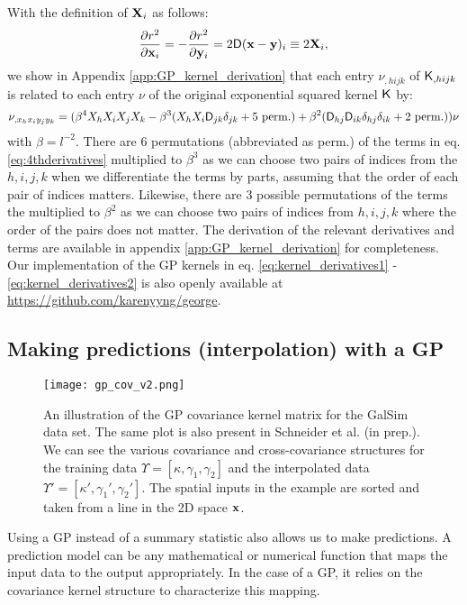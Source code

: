 With the definition of ${\bf X}_i$ as follows:
\begin{equation}
	\frac{\partial r^2}{\partial \mathbf{x}_i} = -\frac{\partial
	r^2}{\partial \mathbf{y}_i} =
	2 \mathsf{D}(\mathbf{x} - \mathbf{y})_i \equiv 2{\bf X}_i,
\end{equation}
we show in Appendix \ref{app:GP_kernel_derivation} 
that each entry $\nu_{,hijk}$ of $\mathsf{K}_{,hijk}$ is
related to each entry $\nu$ of the original exponential squared kernel
$\mathsf{K}$ by:
\begin{equation}
\nu_{,x_h x_i y_j y_k} = (\beta^4 X_h X_i X_j X_k -
\beta^3 (X_h X_i \mathsf{D}_{jk} \delta_{jk} + 5~{\rm perm.}) + \beta^2
(\mathsf{D}_{hj} \mathsf{D}_{ik}\delta_{hj}\delta_{ik} + 2~{\rm perm.})) \nu
\label{eq:4thderivatives}
\end{equation}
with $\beta = l^{-2}$. There are 6 permutations (abbreviated as perm.) of the terms in
eq. \ref{eq:4thderivatives}
multiplied to $\beta^3$ as we can choose two pairs of indices from the $h,i,j,k$ 
when we differentiate the terms by parts, assuming that the order of each
pair of indices matters. 
Likewise, there are 3 possible permutations of
the terms the multiplied to $\beta^2$ as we can choose two pairs of indices from
$h, i, j, k$ where the order of the pairs does not matter.
The derivation of the relevant derivatives and terms are available 
in appendix \ref{app:GP_kernel_derivation} for completeness. 
Our implementation of the GP kernels in eq. \ref{eq:kernel_derivatives1} - 
\ref{eq:kernel_derivatives2} is also openly available at
\href{https://github.com/karenyyng/george}{https://github.com/karenyyng/george}.


\subsection{Making predictions (interpolation) with a GP}

\begin{figure}
	\centering
	\texttt{[image: gp\_cov\_v2.png]}
	\caption{An illustration of the GP covariance kernel matrix for the {\sc GalSim} data set.
		The same plot is also present in Schneider et al. (in prep.). We can see the various covariance
		and cross-covariance
		structures for the training data $\Upsilon = [\kappa, \gamma_1, \gamma_2]$
		and the interpolated data $\Upsilon' = [\kappa', \gamma_1', \gamma_2']$.
		The spatial inputs in the example are sorted and taken from a line in the
		2D space $\mathbf{x}$. 
		\label{fig:GP_kernel_vis}}
\end{figure}
Using a GP instead of a summary statistic also allows us to make predictions. 
A prediction model can be any mathematical or numerical function that maps 
the input data to the output appropriately. In the case of a GP, it relies on the covariance
kernel structure to characterize this mapping.  

